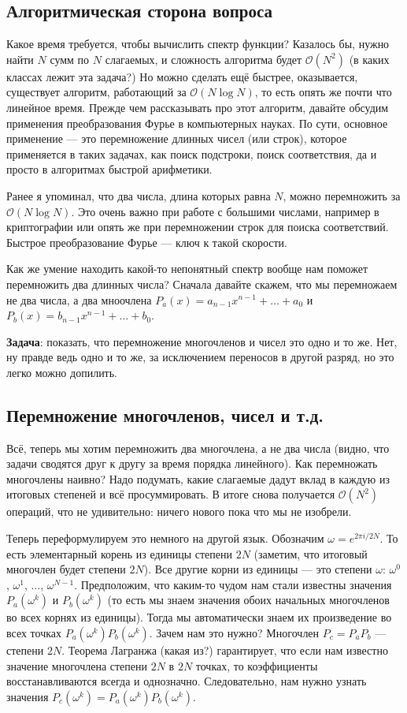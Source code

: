 \documentclass[12pt]{article}
\begin{document}
\subsection*{Алгоритмическая сторона вопроса}
Какое время требуется, чтобы вычислить спектр функции? Казалось бы, нужно найти $N$ сумм по $N$ слагаемых, и сложность алгоритма будет $\mathcal{O}(N^2)$ (в каких классах лежит эта задача?) Но можно сделать ещё быстрее, оказывается, существует алгоритм, работающий за $\mathcal{O}(N \log N)$, то есть опять же почти что линейное время. Прежде чем рассказывать про этот алгоритм, давайте обсудим применения преобразования Фурье в компьютерных науках. По сути, основное применение --- это перемножение длинных чисел (или строк), которое применяется в таких задачах, как поиск подстроки, поиск соответствия, да и просто в алгоритмах быстрой арифметики.

Ранее я упоминал, что два числа, длина которых равна $N$, можно перемножить за $\mathcal{O}(N \log N)$. Это очень важно при работе с большими числами, например в криптографии или опять же при перемножении строк для поиска соответствий. Быстрое преобразование Фурье --- ключ к такой скорости. 

Как же умение находить какой-то непонятный спектр вообще нам поможет перемножить два длинных числа? Сначала давайте скажем, что мы перемножаем не два числа, а два мноочлена $P_a(x) = a_{n - 1} x^{n - 1} + \ldots + a_0$ и $P_b(x) = b_{n - 1} x^{n - 1} + \ldots + b_0$.

{\bf Задача}: показать, что перемножение многочленов и чисел это одно и то же. Нет, ну правде ведь одно и то же, за исключением переносов в другой разряд, но это легко можно допилить.

\subsection*{Перемножение многочленов, чисел и т.д.}

Всё, теперь мы хотим перемножить два многочлена, а не два числа (видно, что задачи сводятся друг к другу за время порядка линейного). Как перемножать многочлены наивно? Надо подумать, какие слагаемые дадут вклад в каждую из итоговых степеней и всё просуммировать. В итоге снова получается $\mathcal{O}(N^2)$ операций, что не удивительно: ничего нового пока что мы не изобрели. 

Теперь переформулируем это немного на другой язык. Обозначим $\omega = e^{2 \pi i / 2N}$. То есть элементарный корень из единицы степени $2 N$ (заметим, что итоговый многочлен будет степени $2 N$). Все другие корни из единицы --- это степени $\omega$: $\omega^0$, $\omega^1$, $\ldots$, $\omega^{N - 1}$. Предположим, что каким-то чудом нам стали известны значения $P_a(\omega^k)$ и $P_b(\omega^k)$ (то есть мы знаем значения обоих начальных многочленов во всех корнях из единицы). Тогда мы автоматически знаем их произведение во всех точках $P_a(\omega^k) P_b(\omega^k)$. Зачем нам это нужно? Многочлен $P_c = P_a P_b$ --- степени $2N$. Теорема Лагранжа (какая из?) гарантирует, что если нам известно значение многочлена степени $2 N$ в $2 N$ точках, то коэффициенты восстанавливаются всегда и однозначно. Следовательно, нам нужно узнать значения $P_c(\omega^k) = P_a(\omega^k) P_b(\omega^k)$.
\end{document}
